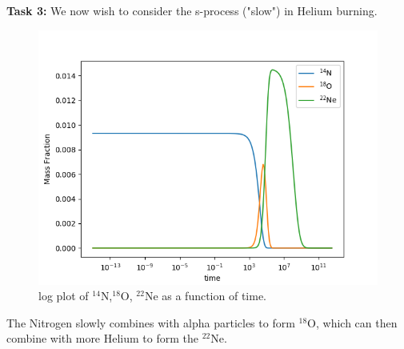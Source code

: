 \documentclass[manuscript]{aastex62}
\begin{document}
{\bf Task 3:}
We now wish to consider the s-process ("slow") in Helium burning. 

\begin{figure}[H]
\includegraphics[scale=0.7]{task3}
\caption{log plot of $^{14}$N,$^{18}$O, $^{22}$Ne as a function of time.}
\end{figure}

The Nitrogen slowly combines with alpha particles to form $^{18}$O, which can then combine with more Helium to form the $^{22}$Ne.
\end{document}
